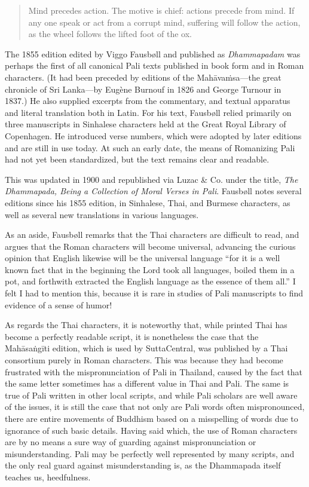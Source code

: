 \documentclass[12pt,openany]{book}%
\begin{document}
\begin{verse}%
Mind precedes action. The motive is chief: actions precede from mind. If any one speak or act from a corrupt mind, suffering will follow the action, as the wheel follows the lifted foot of the ox.

%
\end{verse}

The 1855 edition edited by Viggo Fausbøll and published as \textit{Dhammapadam} was perhaps the first of all canonical Pali texts published in book form and in Roman characters. (It had been preceded by editions of the \textsanskrit{Mahāvaṁsa}—the great chronicle of Sri Lanka—by Eugène Burnouf in 1826 and George Turnour in 1837.) He also supplied excerpts from the commentary, and textual apparatus and literal translation both in Latin. For his text, Fausbøll relied primarily on three manuscripts in Sinhalese characters held at the Great Royal Library of Copenhagen. He introduced verse numbers, which were adopted by later editions and are still in use today. At such an early date, the means of Romanizing Pali had not yet been standardized, but the text remains clear and readable.

This was updated in 1900 and republished via Luzac \& Co. under the title, \textit{The Dhammapada, Being a Collection of Moral Verses in Pali}. Fausbøll notes several editions since his 1855 edition, in Sinhalese, Thai, and Burmese characters, as well as several new translations in various languages.

As an aside, Fausbøll remarks that the Thai characters are difficult to read, and argues that the Roman characters will become universal, advancing the curious opinion that English likewise will be the universal language “for it is a well known fact that in the beginning the Lord took all languages, boiled them in a pot, and forthwith extracted the English language as the essence of them all.” I felt I had to mention this, because it is rare in studies of Pali manuscripts to find evidence of a sense of humor!

As regards the Thai characters, it is noteworthy that, while printed Thai has become a perfectly readable script, it is nonetheless the case that the \textsanskrit{Mahāsaṅgīti} edition, which is used by SuttaCentral, was published by a Thai consortium purely in Roman characters. This was because they had become frustrated with the mispronunciation of Pali in Thailand, caused by the fact that the same letter sometimes has a different value in Thai and Pali. The same is true of Pali written in other local scripts, and while Pali scholars are well aware of the issues, it is still the case that not only are Pali words often mispronounced, there are entire movements of Buddhism based on a misspelling of words due to ignorance of such basic details. Having said which, the use of Roman characters are by no means a sure way of guarding against mispronunciation or misunderstanding. Pali may be perfectly well represented by many scripts, and the only real guard against misunderstanding is, as the Dhammapada itself teaches us, heedfulness.
\end{document}
